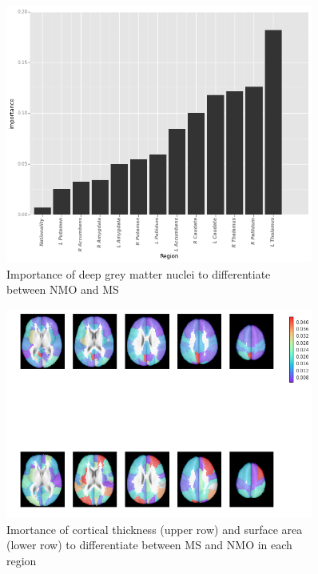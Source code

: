 \documentclass[final]{beamer}
\newlength{\sepwid}
\newlength{\onecolwid}
\newlength{\twocolwid}
\begin{document}
\begin{frame}[t]
\begin{columns}[t]
\begin{column}{\twocolwid}
\begin{columns}[t,totalwidth=\twocolwid]
\begin{column}{\onecolwid}
\end{column} %

\end{columns} %

\end{column} %

\begin{column}{\sepwid}\end{column} %

\begin{column}{\onecolwid} %




\begin{figure}
\includegraphics[width=0.7\linewidth]{v3_dgm_importance.png}
\caption{Importance of deep grey matter nuclei to differentiate between NMO and MS}
\end{figure}


\begin{figure}
\includegraphics[width=0.7\linewidth]{v3_image_importance.png}
\caption{Imortance of cortical thickness (upper row) and surface area (lower row) to differentiate between MS and NMO in each region}
\end{figure}


\end{column}
\end{columns}
\end{frame}
\end{document}
